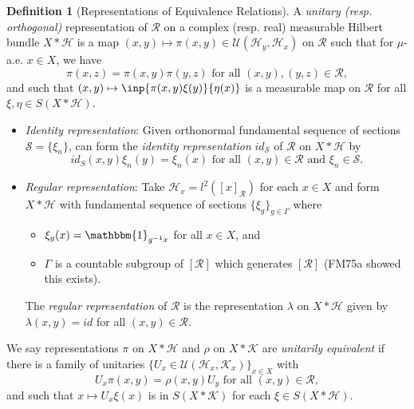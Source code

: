 \documentclass[12pt,letterpaper]{article}
\renewcommand{\H}{\mathcal{H}}
\newcommand{\K}{\mathcal{K}}
\newcommand{\ind}{\mathbbm{1}}
\theoremstyle{definition}
\newtheorem{definition}{Definition}[]
\theoremstyle{plain}
\theoremstyle{remark}
\begin{document}
\begin{definition}[Representations of Equivalence Relations]
    A \textit{unitary (resp. orthogonal)} representation of $ \mathcal{R} $ on a complex (resp. real) measurable Hilbert bundle $ X\ast \H $ is a map $ (x,y)\mapsto \pi(x,y)\in \mathcal{U}(\H_{y},\H_{x}) $ on $ \mathcal{R} $ such that for $ \mu $-a.e. $ x\in X $, we have 
    \[
        \pi(x,z) = \pi(x,y) \pi(y,z) \text{ for all } (x,y),(y,z)\in \mathcal{R},
    \]
    and such that $ (x,y)\mapsto \inp{\pi(x,y) \xi(y)}{\eta(x)} $ is a measurable map on $ \mathcal{R} $ for all $ \xi,\eta\in S(X\ast\H) $.

    \begin{itemize}
        \item \textit{Identity representation}: Given orthonormal fundamental sequence of sections $ \mathcal{S} = \{\xi_{n}\}$, can form the \textit{identity representation} $ id_{\mathcal{S}} $ of $ \mathcal{R} $ on $ X\ast\H $ by 
            \[
                id_{S}(x,y) \xi_{n}(y) = \xi_{n}(x) \text{ for all } (x,y)\in \mathcal{R} \text{ and } \xi_{n} \in \mathcal{S}.
            \]
        \item \textit{Regular representation}: Take $ \H_{x} = l^{2}([x]_{\mathcal{R}}) $ for each $ x\in X $ and form $ X\ast \H $ with fundamental sequence of sections $ \{\xi_{g}\}_{g\in \Gamma} $ where 
            \begin{itemize}
                \item $ \xi_{g}(x) = \ind_{g^{-1}x} $ for all $ x\in X $, and
                \item $ \Gamma $ is a countable subgroup of $ [\mathcal{R}] $ which generates $ [\mathcal{R}] $ (FM75a showed this exists).
            \end{itemize}
        The \textit{regular representation} of $ \mathcal{R} $ is the representation $ \lambda $ on $ X\ast\H $ given by $ \lambda(x,y) = id $ for all $ (x,y)\in \mathcal{R} $.
    \end{itemize}
    

    We say representations $ \pi $ on $ X\ast \H $ and $ \rho $ on $ X\ast\K $ are \textit{unitarily equivalent} if there is a family of unitaries $ \{U_{x} \in \mathcal{U}(\H_{x},\K_{x})\}_{x\in X} $ with
    \[
        U_{x} \pi(x,y) = \rho(x,y) U_{y} \text{ for all } (x,y)\in \mathcal{R},
    \]
    and such that $ x\mapsto U_{x} \xi(x) $ is in $ S(X\ast\K) $ for each $ \xi\in S(X\ast\H) $.

\end{definition}
\end{document}

